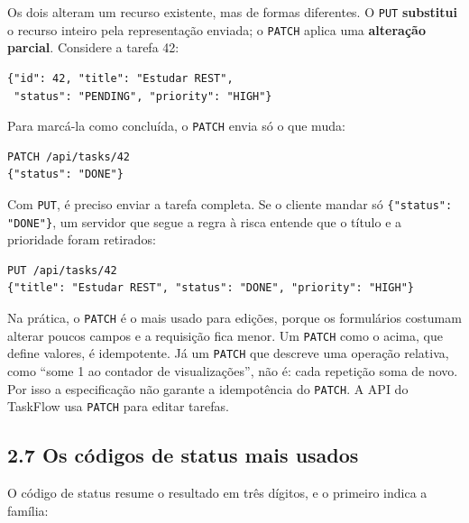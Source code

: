 Os dois alteram um recurso existente, mas de formas diferentes. O \texttt{PUT} \textbf{substitui} o recurso inteiro pela representação enviada; o \texttt{PATCH} aplica uma \textbf{alteração parcial}. Considere a tarefa 42:

\begin{codigo}
\begin{Verbatim}[breaklines=true, breaksymbolleft={}, fontsize=\footnotesize]
{"id": 42, "title": "Estudar REST",
 "status": "PENDING", "priority": "HIGH"}
\end{Verbatim}
\end{codigo}

Para marcá-la como concluída, o \texttt{PATCH} envia só o que muda:

\begin{codigo}
\begin{Verbatim}[breaklines=true, breaksymbolleft={}, fontsize=\footnotesize]
PATCH /api/tasks/42
{"status": "DONE"}
\end{Verbatim}
\end{codigo}

Com \texttt{PUT}, é preciso enviar a tarefa completa. Se o cliente mandar só \texttt{\{"status": "DONE"\}}, um servidor que segue a regra à risca entende que o título e a prioridade foram retirados:

\begin{codigo}
\begin{Verbatim}[breaklines=true, breaksymbolleft={}, fontsize=\footnotesize]
PUT /api/tasks/42
{"title": "Estudar REST", "status": "DONE", "priority": "HIGH"}
\end{Verbatim}
\end{codigo}

Na prática, o \texttt{PATCH} é o mais usado para edições, porque os formulários costumam alterar poucos campos e a requisição fica menor. Um \texttt{PATCH} como o acima, que define valores, é idempotente. Já um \texttt{PATCH} que descreve uma operação relativa, como ``some 1 ao contador de visualizações'', não é: cada repetição soma de novo. Por isso a especificação não garante a idempotência do \texttt{PATCH}. A API do TaskFlow usa \texttt{PATCH} para editar tarefas.

\subsection{2.7 Os códigos de status mais usados}

O código de status resume o resultado em três dígitos, e o primeiro indica a família:

